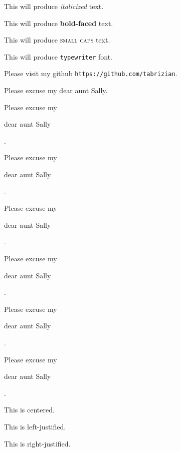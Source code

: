 \documentclass[11pt]{article}
\begin{document}
	
This will produce \textit{italicized} text.	

This will produce \textbf{bold-faced} text.

This will produce \textsc{small caps} text.

This will produce \texttt{typewriter} font.

Please visit my github \texttt{https://github.com/tabrizian}.

Please excuse my dear aunt Sally.

Please excuse my\begin{large} dear aunt Sally\end{large}.

Please excuse my\begin{Large} dear aunt Sally\end{Large}.

Please excuse my\begin{huge} dear aunt Sally\end{huge}.

Please excuse my\begin{Huge} dear aunt Sally\end{Huge}.

Please excuse my\begin{small} dear aunt Sally\end{small}.

Please excuse my\begin{tiny} dear aunt Sally\end{tiny}.	

\begin{center}This is centered. \end{center}

\begin{flushleft}This is left-justified.\end{flushleft}

\begin{flushright}This is right-justified.\end{flushright}
\end{document}
